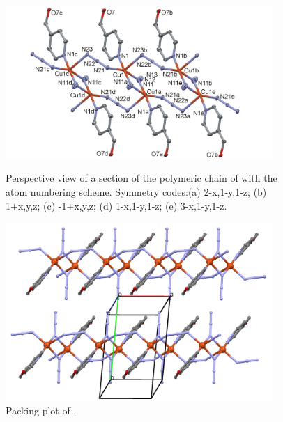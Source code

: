 \begin{figure}[!htpb]
\centering
\includegraphics[width=0.90\textwidth]{figures/cuahomp_FIGm12.png}
\caption[Perspective view of ]{Perspective view of a section of the polymeric chain of  with the atom numbering scheme. 
Symmetry codes:(a) 2-x,1-y,1-z; (b) 1+x,y,z; (c) -1+x,y,z; (d) 1-x,1-y,1-z; (e) 3-x,1-y,1-z.}
\label{fig:CuA4HOMP_pv}
\vspace{\floatsep}
\includegraphics[width=0.90\textwidth]{figures/cuahomp_CC.png}
\caption{Packing plot of .}
\label{fig:CuA4HOMP_packv}
\end{figure}


\renewcommand{\arraystretch}{1.5}

